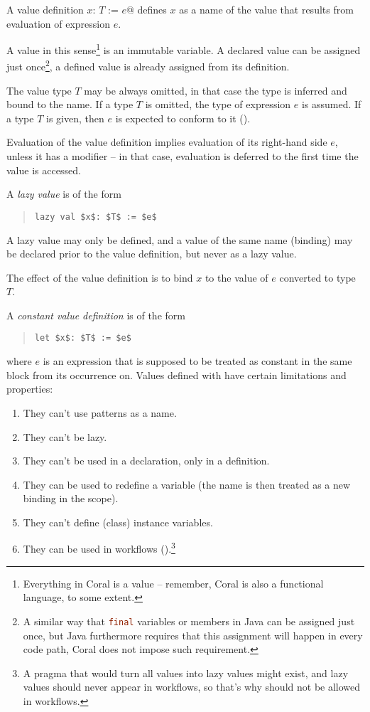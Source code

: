 A value definition \lstinline@val $x$: $T$ := $e$@ defines $x$ as a name of the value that results from evaluation of expression $e$.

A value in this sense\footnote{Everything in Coral is a value -- remember, Coral is also a functional language, to some extent.} is an immutable variable. A declared value can be assigned just once\footnote{A similar way that \lstinline[language=Java]@final@ variables or members in Java can be assigned just once, but Java furthermore requires that this assignment will happen in every code path, Coral does not impose such requirement.}, a defined value is already assigned from its definition. 

The value type $T$ may be always omitted, in that case the type is inferred and bound to the name. If a type $T$ is omitted, the type of expression $e$ is assumed. If a type $T$ is given, then $e$ is expected to conform to it (). 

Evaluation of the value definition implies evaluation of its right-hand side $e$, unless it has a modifier  -- in that case, evaluation is deferred to the first time the value is accessed. 

A {\em lazy value} is of the form
\begin{quote}\begin{lstlisting}
lazy val $x$: $T$ := $e$
\end{lstlisting}\end{quote}

A lazy value may only be defined, and a value of the same name (binding) may be declared prior to the value definition, but never as a lazy value. 

The effect of the value definition is to bind $x$ to the value of $e$ converted to type $T$. 

A {\em constant value definition} is of the form 
\begin{quote}\begin{lstlisting}
let $x$: $T$ := $e$
\end{lstlisting}\end{quote}
where $e$ is an expression that is supposed to be treated as constant in the same block from its occurrence on. Values defined with  have certain limitations and properties:

\begin{enumerate}
\item They can't use patterns as a name. 
\item They can't be lazy. 
\item They can't be used in a declaration, only in a definition. 
\item They can be used to redefine a variable (the name is then treated as a new binding in the scope). 
\item They can't define (class) instance variables. 
\item They can be used in workflows ().\footnote{A pragma that would turn all values into lazy values might exist, and lazy values should never appear in workflows, so that's why  should not be allowed in workflows.}
\end{enumerate}

